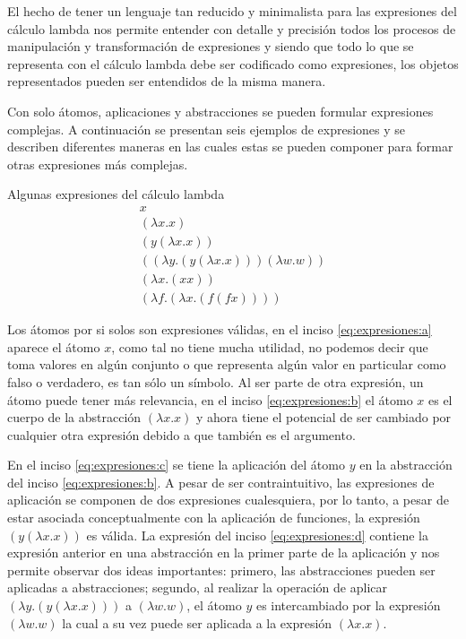 El hecho de tener un lenguaje tan reducido y minimalista para las expresiones del cálculo lambda nos permite entender con detalle y precisión todos los procesos de manipulación y transformación de expresiones y siendo que todo lo que se representa con el cálculo lambda debe ser codificado como expresiones, los objetos representados pueden ser entendidos de la misma manera.

Con solo átomos, aplicaciones y abstracciones se pueden formular expresiones complejas. A continuación se presentan seis ejemplos de expresiones y se describen diferentes maneras en las cuales estas se pueden componer para formar otras expresiones más complejas.

\begin{exmp}
  Algunas expresiones del cálculo lambda
  \label{exmp:expresiones}
  \begin{subequations}
    \begin{gather}
      \label{eq:expresiones:a} \tag{a}
      x \\
      \label{eq:expresiones:b} \tag{b}
      (λx.x) \\
      \label{eq:expresiones:c} \tag{c}
      (y(λx.x)) \\
      \label{eq:expresiones:d} \tag{d}
      ((λy.(y(λx.x)))(λw.w)) \\
      \label{eq:expresiones:e} \tag{e}
      (λx.(x x)) \\
      \label{eq:expresiones:f} \tag{f}
      (λf.(λx.(f(f x))))
    \end{gather}
  \end{subequations}
\end{exmp}


Los átomos por si solos son expresiones válidas, en el inciso \eqref{eq:expresiones:a} aparece el átomo \( x \), como tal no tiene mucha utilidad, no podemos decir que toma valores en algún conjunto o que representa algún valor en particular como falso o verdadero, es tan sólo un símbolo. Al ser parte de otra expresión, un átomo puede tener más relevancia, en el inciso \eqref{eq:expresiones:b} el átomo \( x \) es el cuerpo de la abstracción \( (λx.x) \) y ahora tiene el potencial de ser cambiado por cualquier otra expresión debido a que también es el argumento.

En el inciso \eqref{eq:expresiones:c} se tiene la aplicación del átomo \( y \) en la abstracción del inciso \eqref{eq:expresiones:b}. A pesar de ser contraintuitivo, las expresiones de aplicación se componen de dos expresiones cualesquiera, por lo tanto, a pesar de estar asociada conceptualmente con la aplicación de funciones, la expresión \( (y (λx.x)) \) es válida. La expresión del inciso \eqref{eq:expresiones:d} contiene la expresión anterior en una abstracción en la primer parte de la aplicación y nos permite observar dos ideas importantes: primero, las abstracciones pueden ser aplicadas a abstracciones; segundo, al realizar la operación de aplicar \( (λy.(y(λx.x))) \) a \( (λw.w) \), el átomo \( y \) es intercambiado por la expresión \( (λw.w) \) la cual a su vez puede ser aplicada a la expresión \( (λx.x) \).

